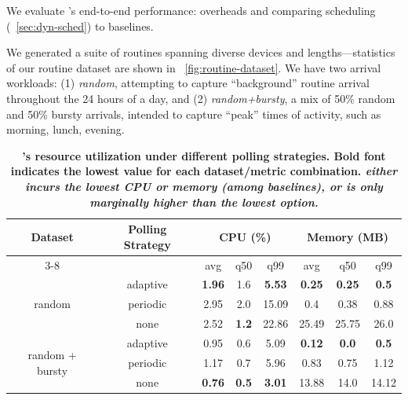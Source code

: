 We evaluate \sysname's end-to-end performance: overheads and comparing \scheduler{} scheduling (\Section~\ref{sec:dyn-sched})
to baselines.

We generated a suite of routines spanning diverse devices and lengths---statistics of our routine dataset are shown in \Figure~\ref{fig:routine-dataset}.
We have two
arrival workloads: (1) {\it random}, attempting to capture ``background'' routine arrival throughout the 24 hours of a day, 
and (2)  {\it random+bursty}, a mix of 50\% random and 50\% bursty arrivals, 
intended to capture ``peak'' times of activity, such as morning, lunch, evening.

\begin{table}[t]
    \centering
    \footnotesize
    \setlength{\tabcolsep}{5pt}
    \begin{tabular}{|c|c|c|c|c|c|c|c|}
        \hline
        \multirow{2}{*}{Dataset} & \multirow{2}{*}{\parbox{1cm}{\centering Polling Strategy}} & \multicolumn{3}{c|}{CPU (\%)} & \multicolumn{3}{c|}{Memory (MB)} \\
        \cline{3-8}  %
         & & avg & q50 & q99 & avg & q50 & q99 \\
        \hline\hline
        \multirow{3}{*}{random} & adaptive & \textbf{1.96} & 1.6 & \textbf{5.53} & \textbf{0.25} & \textbf{0.25} & \textbf{0.5} \\
         & periodic & 2.95 & 2.0 & 15.09 & 0.4 & 0.38 & 0.88 \\
         & none & 2.52 & \textbf{1.2} & 22.86 & 25.49 & 25.75 & 26.0 \\
        \hline
        \multirow{3}{*}{\parbox{0.85cm}{\centering random + bursty}} & adaptive & 0.95 & 0.6 & 5.09 & \textbf{0.12} & \textbf{0.0} & \textbf{0.5} \\
         & periodic & 1.17 & 0.7 & 5.96 & 0.83 & 0.75 & 1.12 \\
         & none & \textbf{0.76} & \textbf{0.5} & \textbf{3.01} & 13.88 & 14.0 & 14.12 \\
        \hline
    \end{tabular}
    \vspace{-0.3cm}
    \caption{\bf \small \sysname's resource utilization under different polling strategies. Bold font indicates the lowest value for each dataset/metric combination. {\it \sysname{} either incurs the lowest CPU or memory (among baselines), or is only marginally higher than the lowest option.}}
    \label{tab:resource-overheads}
    \vspace{-0.6cm}
\end{table}

